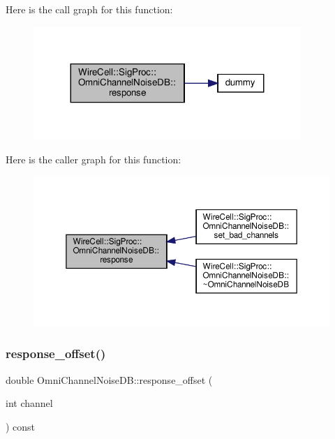 Here is the call graph for this function\+:
\nopagebreak
\begin{figure}[H]
\begin{center}
\leavevmode
\includegraphics[width=287pt]{class_wire_cell_1_1_sig_proc_1_1_omni_channel_noise_d_b_ae269e377629b9a96c8e0cdb0f30353a4_cgraph}
\end{center}
\end{figure}
Here is the caller graph for this function\+:
\nopagebreak
\begin{figure}[H]
\begin{center}
\leavevmode
\includegraphics[width=350pt]{class_wire_cell_1_1_sig_proc_1_1_omni_channel_noise_d_b_ae269e377629b9a96c8e0cdb0f30353a4_icgraph}
\end{center}
\end{figure}
\mbox{\label{class_wire_cell_1_1_sig_proc_1_1_omni_channel_noise_d_b_a0b6fa7b4d342adf1313b86684b811023}} 
\subsubsection{\texorpdfstring{response\+\_\+offset()}{response\_offset()}}
{\footnotesize\ttfamily double Omni\+Channel\+Noise\+D\+B\+::response\+\_\+offset (\begin{DoxyParamCaption}\item[{int}]{channel }\end{DoxyParamCaption}) const\hspace{0.3cm}{\ttfamily [virtual]}}



